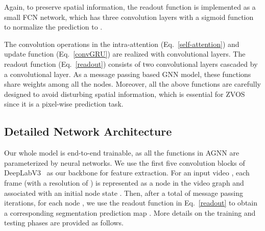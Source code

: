 \documentclass[10pt,twocolumn,letterpaper]{article}
\begin{document}
Again, to preserve spatial information, the readout function is implemented as a small FCN network, which has three convolution layers with a sigmoid function to normalize the prediction to .


The convolution operations in the intra-attention (Eq.~\ref{self-attention}) and update function (Eq.~\ref{convGRU}) are realized with  convolutional layers. The readout function (Eq.~\ref{readout}) consists of two  convolutional layers cascaded by a  convolutional layer. As a message passing based GNN model, these functions share weights among all the nodes. Moreover, all the above functions are carefully designed to avoid disturbing spatial information, which is essential for ZVOS since it is  a pixel-wise prediction task.


\subsection{Detailed Network Architecture}\label{sec:detial}
	\vspace*{-2pt}	
Our whole model is  end-to-end trainable, as all the functions in AGNN are parameterized by neural networks. We use the first five convolution blocks of DeepLabV3~\cite{DBLP:journals/corr/ChenPSA17} as our backbone for feature extraction. For an input video , each frame  (with a resolution of ) is represented as a node  in the video graph  and associated with an initial node state . Then, after a total of  message passing iterations, for each node , we use the readout function in Eq.~\ref{readout} to obtain a corresponding segmentation prediction map . More details on the training and testing phases  are provided as follows.
\end{document}
